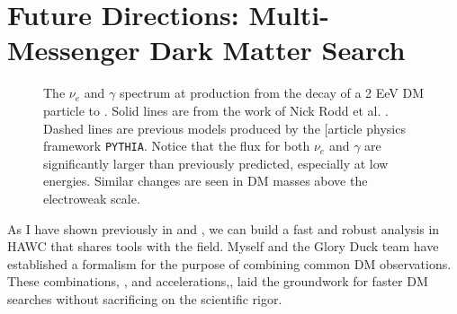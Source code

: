 \section{Future Directions: Multi-Messenger Dark Matter Search}\label{sec:future}

\begin{figure}[h]
    \caption{The $\nu_e$ and $\gamma$ spectrum at production from the decay of a 2 EeV DM particle to . Solid lines are from the work of Nick Rodd et al. \cite{Rodd:HDM_spec}. Dashed lines are previous models produced by the [article physics framework \texttt{PYTHIA}. Notice that the flux for both $\nu_e$ and $\gamma$ are significantly larger than previously predicted, especially at low energies. Similar changes are seen in DM masses above the electroweak scale.}
    \label{fig:nu_and_gam}
\end{figure}

As I have shown previously in  and , we can build a fast and robust analysis in HAWC that shares tools with the field.
Myself and the Glory Duck team have established a formalism for the purpose of combining common DM observations.
These combinations, , and accelerations,, laid the groundwork for faster DM searches without sacrificing on the scientific rigor.

